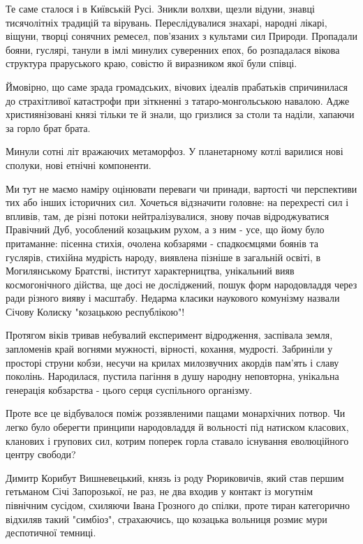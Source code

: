 Те саме сталося і в Київській Русі. Зникли волхви, щезли відуни, знавці
тисячолітніх традицій та вірувань. Переслідувалися знахарі, народні лікарі,
віщуни, творці сонячних ремесел, пов'язаних з культами сил Природи. Пропадали
бояни, гуслярі, танули в імлі минулих суверенних епох, бо розпадалася вікова
структура праруського краю, совістю й виразником якої були співці.

Ймовірно, що саме зрада громадських, вічових ідеалів прабатьків спричинилася до
страхітливої катастрофи при зіткненні з татаро-монгольською навалою. Адже
християнізовані князі тільки те й знали, що гризлися за столи та наділи,
хапаючи за горло брат брата.

Минули сотні літ вражаючих метаморфоз. У планетарному котлі варилися нові сполуки, нові етнічні компоненти.

Ми тут не маємо наміру оцінювати переваги чи принади, вартості чи перспективи
тих або інших історичних сил. Хочеться відзначити головне: на перехресті сил і
впливів, там, де різні потоки нейтралізувалися, знову почав відроджуватися
Правічний Дуб, уособлений козацьким рухом, а з ним - усе, що йому було
притаманне: пісенна стихія, очолена кобзарями - спадкоємцями боянів та
гуслярів, стихійна мудрість народу, виявлена пізніше в загальній освіті, в
Могилянському Братстві, інститут характерництва, унікальний вияв космогонічного
дійства, ще досі не досліджений, пошук форм народовладдя через ради різного
вияву і масштабу. Недарма класики наукового комунізму назвали Січову Колиску
"козацькою республікою"!

Протягом віків тривав небувалий експеримент відродження, заспівала земля,
запломенів край вогнями мужності, вірності, кохання, мудрості. Забриніли у
просторі струни кобзи, несучи на крилах милозвучних акордів пам'ять і славу
поколінь. Народилася, пустила пагіння в душу народну неповторна, унікальна
генерація кобзарства - цього серця суспільного організму.

Проте все це відбувалося поміж роззявленими пащами монархічних потвор. Чи легко
було оберегти принципи народовладдя й вольності під натиском класових, кланових
і групових сил, котрим поперек горла ставало існування еволюційного центру
свободи?

Димитр Корибут Вишневецький, князь із роду Рюриковичів, який став першим
гетьманом Січі Запорозької, не раз, не два входив у контакт із могутнім
північним сусідом, схиляючи Івана Грозного до спілки, проте тиран категорично
відхиляв такий "симбіоз", страхаючись, що козацька вольниця розмиє мури
деспотичної темниці.

